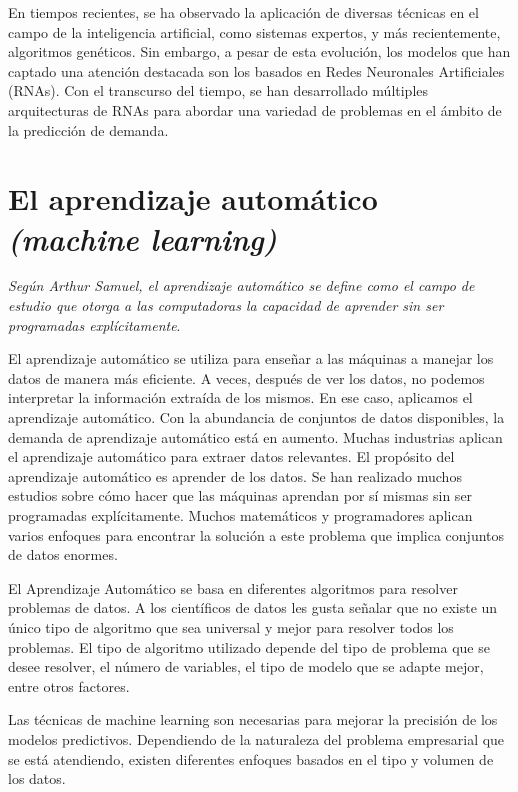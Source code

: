 En tiempos recientes, se ha observado la aplicación de diversas técnicas en el campo de la inteligencia artificial, como sistemas expertos, y más recientemente, algoritmos genéticos. Sin embargo, a pesar de esta evolución, los modelos que han captado una atención destacada son los basados en Redes Neuronales Artificiales (RNAs). Con el transcurso del tiempo, se han desarrollado múltiples arquitecturas de RNAs para abordar una variedad de problemas en el ámbito de la predicción de demanda.

\section{El aprendizaje automático \textit{(machine learning)}}

\textit{Según Arthur Samuel, el aprendizaje automático se define como el campo de estudio que otorga a las computadoras la capacidad de aprender sin ser programadas explícitamente}\cite{mahesh2020machine}. 

El aprendizaje automático se utiliza para enseñar a las máquinas a manejar los datos de manera más eficiente. A veces, después de ver los datos, no podemos interpretar la información extraída de los mismos. En ese caso, aplicamos el aprendizaje automático. Con la abundancia de conjuntos de datos disponibles, la demanda de aprendizaje automático está en aumento. Muchas industrias aplican el aprendizaje automático para extraer datos relevantes. El propósito del aprendizaje automático es aprender de los datos. Se han realizado muchos estudios sobre cómo hacer que las máquinas aprendan por sí mismas sin ser programadas explícitamente. Muchos matemáticos y programadores aplican varios enfoques para encontrar la solución a este problema que implica conjuntos de datos enormes.

\vspace{1\baselineskip}El Aprendizaje Automático se basa en diferentes algoritmos para resolver problemas de datos. A los científicos de datos les gusta señalar que no existe un único tipo de algoritmo que sea universal y mejor para resolver todos los problemas. El tipo de algoritmo utilizado depende del tipo de problema que se desee resolver, el número de variables, el tipo de modelo que se adapte mejor, entre otros factores. 

Las técnicas de machine learning son necesarias para mejorar la precisión de los modelos predictivos. Dependiendo de la naturaleza del problema empresarial que se está atendiendo, existen diferentes enfoques basados en el tipo y volumen de los datos\cite{ibm}.

